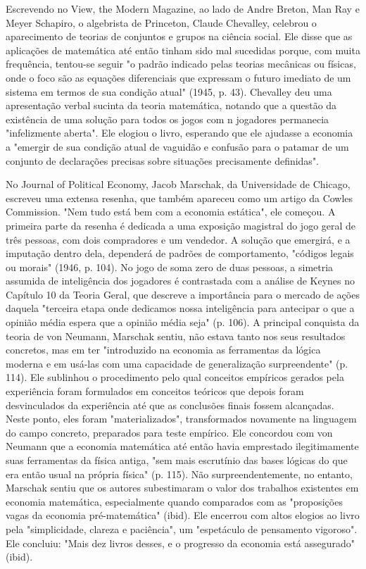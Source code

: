 \documentclass[a4paper,12pt]{article}[abntex2]
\begin{document}
Escrevendo no View, the Modern Magazine, ao lado de Andre Breton, Man Ray e Meyer Schapiro, o algebrista de Princeton, Claude Chevalley, celebrou o aparecimento de teorias de conjuntos e grupos na ciência social. Ele disse que as aplicações de matemática até então tinham sido mal sucedidas porque, com muita frequência, tentou-se seguir "o padrão indicado pelas teorias mecânicas ou físicas, onde o foco são as equações diferenciais que expressam o futuro imediato de um sistema em termos de sua condição atual" (1945, p. 43). Chevalley deu uma apresentação verbal sucinta da teoria matemática, notando que a questão da existência de uma solução para todos os jogos com n jogadores permanecia "infelizmente aberta". Ele elogiou o livro, esperando que ele ajudasse a economia a "emergir de sua condição atual de vaguidão e confusão para o patamar de um conjunto de declarações precisas sobre situações precisamente definidas".

No Journal of Political Economy, Jacob Marschak, da Universidade de Chicago, escreveu uma extensa resenha, que também apareceu como um artigo da Cowles Commission. "Nem tudo está bem com a economia estática", ele começou. A primeira parte da resenha é dedicada a uma exposição magistral do jogo geral de três pessoas, com dois compradores e um vendedor. A solução que emergirá, e a imputação dentro dela, dependerá de padrões de comportamento, "códigos legais ou morais" (1946, p. 104). No jogo de soma zero de duas pessoas, a simetria assumida de inteligência dos jogadores é contrastada com a análise de Keynes no Capítulo 10 da Teoria Geral, que descreve a importância para o mercado de ações daquela "terceira etapa onde dedicamos nossa inteligência para antecipar o que a opinião média espera que a opinião média seja" (p. 106). A principal conquista da teoria de von Neumann, Marschak sentiu, não estava tanto nos seus resultados concretos, mas em ter "introduzido na economia as ferramentas da lógica moderna e em usá-las com uma capacidade de generalização surpreendente" (p. 114). Ele sublinhou o procedimento pelo qual conceitos empíricos gerados pela experiência foram formulados em conceitos teóricos que depois foram desvinculados da experiência até que as conclusões finais fossem alcançadas. Neste ponto, eles foram "materializados", transformados novamente na linguagem do campo concreto, preparados para teste empírico. Ele concordou com von Neumann que a economia matemática até então havia emprestado ilegitimamente suas ferramentas da física antiga, "sem mais escrutínio das bases lógicas do que era então usual na própria física" (p. 115). Não surpreendentemente, no entanto, Marschak sentiu que os autores subestimaram o valor dos trabalhos existentes em economia matemática, especialmente quando comparados com as "proposições vagas da economia pré-matemática" (ibid). Ele encerrou com altos elogios ao livro pela "simplicidade, clareza e paciência", um "espetáculo de pensamento vigoroso". Ele concluiu: "Mais dez livros desses, e o progresso da economia está assegurado" (ibid).
\end{document}

